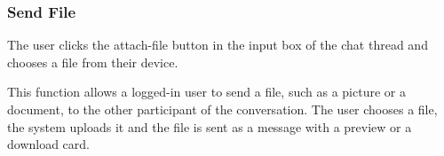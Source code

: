 
\subsubsection{Send File}

 The user clicks the attach-file button in the input box of the chat thread and chooses a file from their device.

 This function allows a logged-in user to send a file, such as a picture or a document, to the other participant of the conversation. The user chooses a file, the system uploads it and the file is sent as a message with a preview or a download card.



